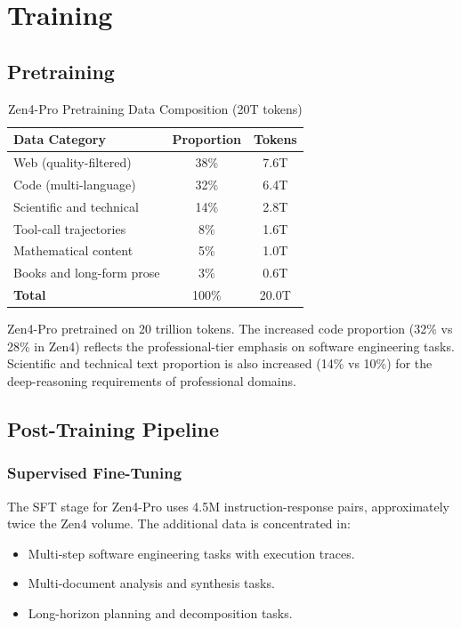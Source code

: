 \documentclass[11pt,a4paper]{article}
\begin{document}
\section{Training}

\subsection{Pretraining}

\begin{table}[H]
\centering
\begin{tabular}{lcc}
\toprule
\textbf{Data Category} & \textbf{Proportion} & \textbf{Tokens} \\
\midrule
Web (quality-filtered)         & 38\%  & 7.6T \\
Code (multi-language)          & 32\%  & 6.4T \\
Scientific and technical       & 14\%  & 2.8T \\
Tool-call trajectories         & 8\%   & 1.6T \\
Mathematical content           & 5\%   & 1.0T \\
Books and long-form prose      & 3\%   & 0.6T \\
\midrule
\textbf{Total}                 & 100\% & 20.0T \\
\bottomrule
\end{tabular}
\caption{Zen4-Pro Pretraining Data Composition (20T tokens)}
\end{table}

Zen4-Pro pretrained on 20 trillion tokens. The increased code proportion (32\% vs 28\% in Zen4)
reflects the professional-tier emphasis on software engineering tasks. Scientific and technical
text proportion is also increased (14\% vs 10\%) for the deep-reasoning requirements of
professional domains.

\subsection{Post-Training Pipeline}

\subsubsection{Supervised Fine-Tuning}

The SFT stage for Zen4-Pro uses 4.5M instruction-response pairs, approximately twice the
Zen4 volume. The additional data is concentrated in:
\begin{itemize}
    \item Multi-step software engineering tasks with execution traces.
    \item Multi-document analysis and synthesis tasks.
    \item Long-horizon planning and decomposition tasks.
\end{itemize}
\end{document}
